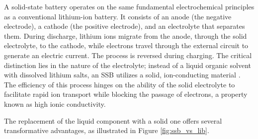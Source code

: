 A solid-state battery operates on the same fundamental electrochemical principles as a conventional lithium-ion battery. It consists of an anode (the negative electrode), a cathode (the positive electrode), and an electrolyte that separates them. During discharge, lithium ions migrate from the anode, through the solid electrolyte, to the cathode, while electrons travel through the external circuit to generate an electric current. The process is reversed during charging. The critical distinction lies in the nature of the electrolyte; instead of a liquid organic solvent with dissolved lithium salts, an SSB utilizes a solid, ion-conducting material \cite{Bachman2016}. The efficiency of this process hinges on the ability of the solid electrolyte to facilitate rapid ion transport while blocking the passage of electrons, a property known as high ionic conductivity.

The replacement of the liquid component with a solid one offers several transformative advantages, as illustrated in Figure \ref{fig:ssb_vs_lib}.

